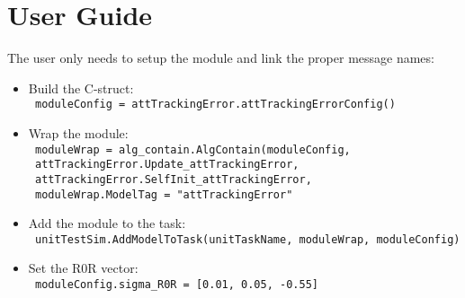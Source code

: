 
\section{User Guide}

The user only needs to setup the module and link the proper message names:

\begin{itemize}
\item Build the C-struct: \\
\texttt{    moduleConfig = attTrackingError.attTrackingErrorConfig()}
\item Wrap the module: \\
\texttt{  moduleWrap = alg\_contain.AlgContain(moduleConfig,} \\
\texttt{  attTrackingError.Update\_attTrackingError,} \\
\texttt{ attTrackingError.SelfInit\_attTrackingError,} \\
\texttt{ moduleWrap.ModelTag = "attTrackingError"}
\item Add the module to the task: \\
 \texttt{ unitTestSim.AddModelToTask(unitTaskName, moduleWrap, moduleConfig)}
\item  Set the R0R vector: \\
\texttt{    moduleConfig.sigma\_R0R  = [0.01, 0.05, -0.55]}
\end{itemize}